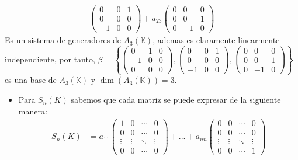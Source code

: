 \begin{ejercicio}
\begin{align*}
\begin{pmatrix}
			0  & 0 & 1 \\
			0  & 0 & 0 \\
			-1 & 0 & 0
		\end{pmatrix} + a_{23} \begin{pmatrix}
			0 & 0  & 0 \\
			0 & 0  & 1 \\
			0 & -1 & 0
		\end{pmatrix}
	\end{align*}
	Es un sistema de generadores de $A_3(\mathbb{K})$, ademas es claramente linearmente independiente, por tanto, $\beta = \left\{ \begin{pmatrix}
			0  & 1 & 0 \\
			-1 & 0 & 0 \\
			0  & 0 & 0
		\end{pmatrix}, \begin{pmatrix}
			0  & 0 & 1 \\
			0  & 0 & 0 \\
			-1 & 0 & 0
		\end{pmatrix}, \begin{pmatrix}
			0 & 0  & 0 \\
			0 & 0  & 1 \\
			0 & -1 & 0
		\end{pmatrix} \right\}$ es una base de $A_3(\mathbb{K})$ y $\dim(A_3(\mathbb{K})) = 3$.
	\begin{itemize}
		\item Para $S_n (K)$ sabemos que cada matriz se puede expresar de la siguiente manera:
		      \begin{align*}
			      S_{n}(K) & = a_{11}\begin{pmatrix}
				                         1      & 0      & \cdots & 0      \\
				                         0      & 0      & \cdots & 0      \\
				                         \vdots & \vdots & \ddots & \vdots \\
				                         0      & 0      & \cdots & 0
			                         \end{pmatrix}
			      + ... + a_{nn}\begin{pmatrix}
				                    0      & 0      & \cdots & 0      \\
				                    0      & 0      & \cdots & 0      \\
				                    \vdots & \vdots & \ddots & \vdots \\
				                    0      & 0      & \cdots & 1

\end{pmatrix}
\end{align*}
\end{itemize}
\end{ejercicio}
